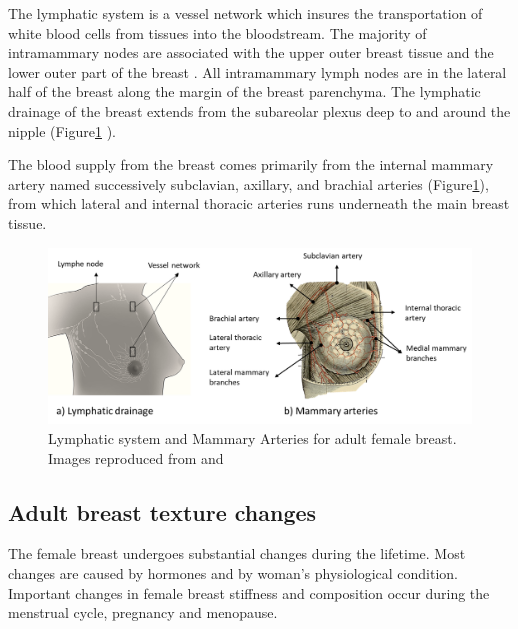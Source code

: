 The lymphatic system is a vessel network which insures the transportation of white blood cells from tissues into the bloodstream. The majority of intramammary nodes are associated with the upper outer breast tissue and the lower outer part of the breast \citep{kopans2007breast}.  All intramammary lymph nodes are in the lateral half of the breast along the margin of the breast parenchyma.  The lymphatic drainage of the breast extends from the subareolar plexus deep to and around the nipple (Figure\ref{fig:lyphaticDrainageandArtery} ).

The blood supply from the breast comes primarily from the internal mammary artery named successively subclavian, axillary, and brachial arteries (Figure\ref{fig:lyphaticDrainageandArtery}), from which lateral and internal thoracic arteries runs underneath the main breast tissue.

	
\begin{figure}[!h]
\centering
\includegraphics[width=\textwidth,keepaspectratio]{figures/lyphaticDrainageandArtery.PNG} 
\caption[Lymphatic system and Mammary Arteries for adult female breast. ]{Lymphatic system and Mammary Arteries for adult female breast.  Images reproduced from \cite{NCI_2012} and \cite{pilcher_breast_1917}}
\label{fig:lyphaticDrainageandArtery}
\end{figure}





\subsection{Adult breast texture changes}\label{subsection:adultbreasttexturechanges}

The female breast undergoes substantial changes during the lifetime.  Most changes are caused by hormones and by woman's physiological condition. Important changes in female breast stiffness and composition occur during the menstrual cycle, pregnancy and menopause. 

